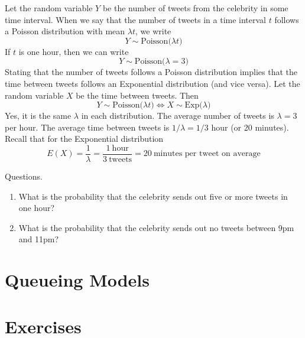 \vspace{.2in}
\begin{center}
\end{center}

Let the random variable $Y$ be the number of tweets from
the celebrity in some time interval.
When we say that the number of tweets in a time interval $t$ follows
a Poisson distribution with mean $\lambda t$, we write
\[
  Y \sim \text{Poisson($\lambda t$)}
\]
If $t$ is one hour, then we can write
\[
  Y \sim \text{Poisson($\lambda = 3$)}
\]
Stating that the number of tweets follows a Poisson distribution
implies that the time between tweets follows an Exponential
distribution (and vice versa). Let the random variable $X$ be
the time between tweets. Then
\[
  Y \sim \text{Poisson($\lambda t$)} \Longleftrightarrow X \sim \text{Exp($\lambda$)}
\]
Yes, it is the same $\lambda$ in each distribution.
The average number of tweets is $\lambda=3$ per hour. The average
time between tweets is $1/\lambda = 1/3$ hour (or 20 minutes).
Recall that for the Exponential distribution
\[
  E(X) = \frac{1}{\lambda} = \frac{1~\text{hour}}{3~\text{tweets}} = 20 ~\text{minutes per tweet on average}
\]

Questions.
\begin{enumerate}
  \item What is the probability that the celebrity sends out five
  or more tweets in one hour?
\item What is the probability that the celebrity sends out
  no tweets between 9pm and 11pm?
\end{enumerate}


\section{Queueing Models}

\section{Exercises}

